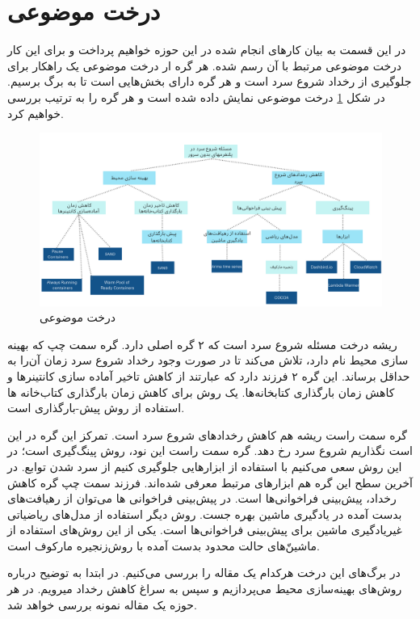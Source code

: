 \section{درخت موضوعی}

در این قسمت به بیان کارهای انجام شده در این حوزه خواهیم پرداخت و برای این کار درخت موضوعی مرتبط با آن رسم شده. هر گره ار درخت موضوعی یک راهکار برای جلوگیری از رخداد شروع سرد است و هر گره دارای بخش‌هایی است تا به برگ برسیم. در شکل \ref{fig:subject-tree} درخت موضوعی نمایش داده شده است و هر گره را به ترتیب بررسی خواهیم کرد. 

\begin{figure}
	\centering
	\includegraphics[width=\linewidth]{figs/subject-tree}
	\caption {درخت موضوعی}
	\label{fig:subject-tree}
\end{figure}

ریشه درخت مسئله شروع سرد است که ۲ گره اصلی دارد. گره سمت چپ که بهینه سازی محیط نام دارد، تلاش می‌کند تا در صورت وجود رخداد شروع سرد زمان آن‌را به حداقل برساند. این گره ۲ فرزند دارد که عبارتند از کاهش تاخیر آماده سازی کانتینرها و کاهش زمان بارگذاری کتابخانه‌ها. یک روش برای کاهش زمان بارگذاری کتاب‌خانه ها استفاده از روش پیش-بارگذاری است. 


گره سمت راست ریشه هم کاهش رخداد‌های شروع سرد است. تمرکز این گره در این است نگذاریم شروع سرد رخ دهد. گره سمت راست این نود، روش پینگ‌گیری است؛ در این روش سعی می‌کنیم با استفاده از ابزارهایی جلوگیری کنیم از سرد شدن توابع. در آخرین سطح این گره هم ابزارهای مرتبط معرفی شده‌اند. فرزند سمت چپ گره کاهش رخداد، پیش‌بینی فراخوانی‌ها است. در پیش‌بینی فراخوانی ها می‌توان از رهیافت‌های بدست آمده در یادگیری ماشین بهره جست. روش دیگر استفاده از مدل‌های ریاضیاتی غیریادگیری ماشین برای پیش‌بینی فراخوانی‌ها است. یکی از این روش‌های استفاده از ماشین‌ّهای حالت محدود بدست آمده با روش‌زنجیره مارکوف است.

 
در برگ‌های این درخت هرکدام یک مقاله را بررسی می‌کنیم. در ابتدا به توضیح درباره روش‌های بهینه‌سازی محیط می‌پردازیم و سپس به سراغ کاهش رخداد میرویم. در هر حوزه یک مقاله نمونه بررسی خواهد شد. 

